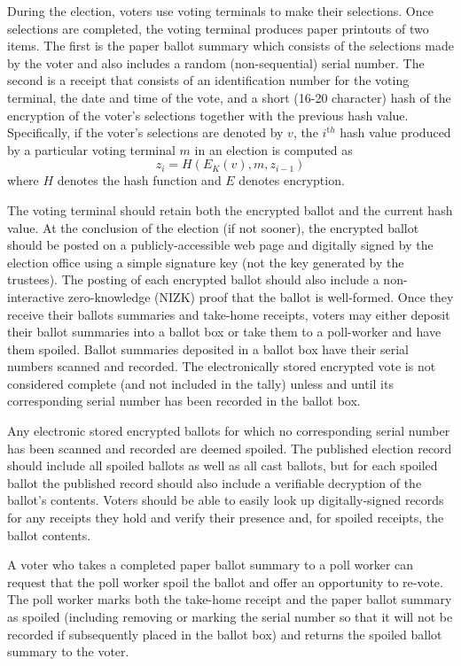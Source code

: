 During the election, voters use voting terminals to make their
selections.  Once selections are completed, the voting terminal
produces paper printouts of two items.  The first is the paper ballot summary
which consists of the selections made by the voter and also includes a
random (non-sequential) serial number.  The second is a receipt that
consists of an identification number for the voting terminal,
the date and time of the vote, and a short (16-20 character) hash of the encryption of
the voter's selections together with the previous hash value.
Specifically, if the voter's selections are denoted by $v$, the
$i^{{\mathrm th}}$ hash value produced by a particular voting terminal $m$ in an election is computed as
\[
z_i=H(E_K(v),m,z_{i-1} )
\]
\noindent
where $H$ denotes the hash function and $E$ denotes encryption.

The voting terminal should retain both the encrypted ballot and the current hash value.  At the conclusion of the election (if not sooner), the encrypted ballot should be posted on a publicly-accessible web page and digitally signed by the election office using a simple signature key (not the key generated by the trustees).  The posting of each encrypted ballot should also include a non-interactive zero-knowledge (NIZK) proof that the ballot is well-formed.
Once they receive their ballots summaries and take-home receipts, voters may either deposit their ballot summaries into a ballot box or take them to a poll-worker and have them spoiled.  Ballot summaries deposited in a ballot box have their serial numbers scanned and recorded.  The electronically stored encrypted vote is not considered complete (and not included in the tally) unless and until its corresponding serial number has been recorded in the ballot box.

Any electronic stored encrypted ballots for which no corresponding serial number has been scanned and recorded are deemed spoiled.  The published election record should include all spoiled ballots as well as all cast ballots, but for each spoiled ballot the published record should also include a verifiable decryption of the ballot's contents.  Voters should be able to easily look up digitally-signed records for any receipts they hold and verify their presence and, for spoiled receipts, the ballot contents.

A voter who takes a completed paper ballot summary to a poll worker can request that the poll worker spoil the ballot and offer an opportunity to re-vote.  The poll worker marks both the take-home receipt and the paper ballot summary as spoiled (including removing or marking the serial number so that it will not be recorded if subsequently placed in the ballot box) and returns the spoiled ballot summary to the voter.

